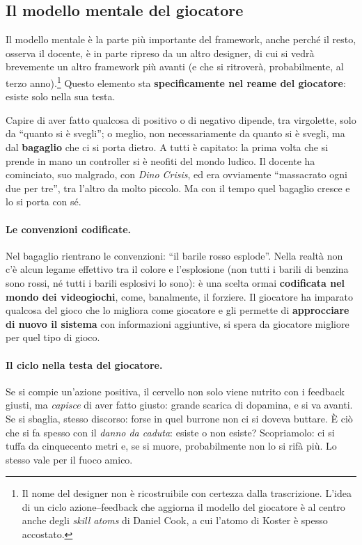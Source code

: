 \subsection{Il modello mentale del giocatore}

Il modello mentale è la parte più importante del framework, anche perché il
resto, osserva il docente, è in parte ripreso da un altro designer, di cui si
vedrà brevemente un altro framework più avanti (e che si ritroverà,
probabilmente, al terzo anno).\footnote{Il nome del designer non è
ricostruibile con certezza dalla trascrizione. L'idea di un ciclo
azione--feedback che aggiorna il modello del giocatore è al centro anche degli
\emph{skill atoms} di Daniel Cook, a cui l'atomo di Koster è spesso
accostato.} Questo elemento sta \textbf{specificamente nel reame del
giocatore}: esiste solo nella sua testa.

Capire di aver fatto qualcosa di positivo o di negativo dipende, tra
virgolette, solo da ``quanto si è svegli''; o meglio, non necessariamente da
quanto si è svegli, ma dal \textbf{bagaglio} che ci si porta dietro. A tutti è
capitato: la prima volta che si prende in mano un controller si è neofiti del
mondo ludico. Il docente ha cominciato, suo malgrado, con \emph{Dino Crisis},
ed era ovviamente ``massacrato ogni due per tre'', tra l'altro da molto
piccolo. Ma con il tempo quel bagaglio cresce e lo si porta con sé.

\paragraph{Le convenzioni codificate.} Nel bagaglio rientrano le convenzioni:
``il barile rosso esplode''. Nella realtà non c'è alcun legame effettivo tra
il colore e l'esplosione (non tutti i barili di benzina sono rossi, né tutti
i barili esplosivi lo sono): è una scelta ormai \textbf{codificata nel mondo
dei videogiochi}, come, banalmente, il forziere. Il giocatore ha imparato
qualcosa del gioco che lo migliora come giocatore e gli permette di
\textbf{approcciare di nuovo il sistema} con informazioni aggiuntive, si
spera da giocatore migliore per quel tipo di gioco.

\paragraph{Il ciclo nella testa del giocatore.} Se si compie un'azione
positiva, il cervello non solo viene nutrito con i feedback giusti, ma
\emph{capisce} di aver fatto giusto: grande scarica di dopamina, e si va
avanti. Se si sbaglia, stesso discorso: forse in quel burrone non ci si
doveva buttare. È ciò che si fa spesso con il \emph{danno da caduta}: esiste
o non esiste? Scopriamolo: ci si tuffa da cinquecento metri e, se si muore,
probabilmente non lo si rifà più. Lo stesso vale per il fuoco amico.

